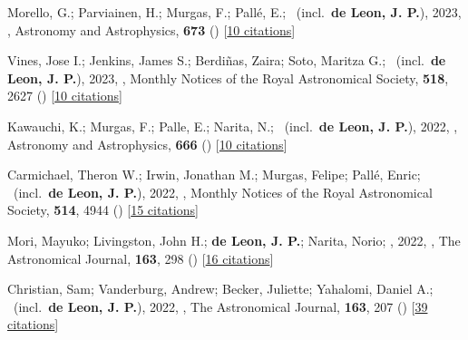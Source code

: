 \item[{\color{numcolor}\scriptsize50}] Morello, G.; Parviainen, H.; Murgas, F.; Pall{\'e}, E.; \etal\ (incl.\ \textbf{de Leon, J. P.}), 2023, , Astronomy and Astrophysics, \textbf{673} () [\href{https://ui.adsabs.harvard.edu/abs/2023A&A...673A..32M}{10 citations}]

\item[{\color{numcolor}\scriptsize49}] Vines, Jose I.; Jenkins, James S.; Berdi{\~n}as, Zaira; Soto, Maritza G.; \etal\ (incl.\ \textbf{de Leon, J. P.}), 2023, , Monthly Notices of the Royal Astronomical Society, \textbf{518}, 2627 () [\href{https://ui.adsabs.harvard.edu/abs/2023MNRAS.518.2627V}{10 citations}]

\item[{\color{numcolor}\scriptsize48}] Kawauchi, K.; Murgas, F.; Palle, E.; Narita, N.; \etal\ (incl.\ \textbf{de Leon, J. P.}), 2022, , Astronomy and Astrophysics, \textbf{666} () [\href{https://ui.adsabs.harvard.edu/abs/2022A&A...666A...4K}{10 citations}]

\item[{\color{numcolor}\scriptsize47}] Carmichael, Theron W.; Irwin, Jonathan M.; Murgas, Felipe; Pall{\'e}, Enric; \etal\ (incl.\ \textbf{de Leon, J. P.}), 2022, , Monthly Notices of the Royal Astronomical Society, \textbf{514}, 4944 () [\href{https://ui.adsabs.harvard.edu/abs/2022MNRAS.514.4944C}{15 citations}]

\item[{\color{numcolor}\scriptsize46}] Mori, Mayuko; Livingston, John H.; \textbf{de Leon, J. P.}; Narita, Norio; \etal, 2022, , The Astronomical Journal, \textbf{163}, 298 () [\href{https://ui.adsabs.harvard.edu/abs/2022AJ....163..298M}{16 citations}]

\item[{\color{numcolor}\scriptsize45}] Christian, Sam; Vanderburg, Andrew; Becker, Juliette; Yahalomi, Daniel A.; \etal\ (incl.\ \textbf{de Leon, J. P.}), 2022, , The Astronomical Journal, \textbf{163}, 207 () [\href{https://ui.adsabs.harvard.edu/abs/2022AJ....163..207C}{39 citations}]


